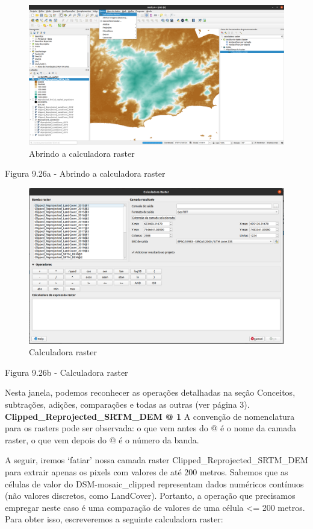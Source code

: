 \documentclass[
]{book}
\begin{document}
\begin{figure}
\centering
\includegraphics{media/modulo9/fig926_a.png}
\caption{Abrindo a calculadora raster}
\end{figure}

Figura 9.26a - Abrindo a calculadora raster

\begin{figure}
\centering
\includegraphics{media/modulo9/fig926_b.png}
\caption{Calculadora raster}
\end{figure}

Figura 9.26b - Calculadora raster

Nesta janela, podemos reconhecer as operações detalhadas na seção Conceitos, subtrações, adições, comparações e todas as outras (ver página 3). \textbf{Clipped\_Reprojected\_SRTM\_DEM @ 1} A convenção de nomenclatura para os rasters pode ser observada: o que vem antes do @ é o nome da camada raster, o que vem depois do @ é o número da banda.

A seguir, iremos `fatiar' nossa camada raster Clipped\_Reprojected\_SRTM\_DEM para extrair apenas os pixels com valores de até 200 metros. Sabemos que as células de valor do DSM-mosaic\_clipped representam dados numéricos contínuos (não valores discretos, como LandCover). Portanto, a operação que precisamos empregar neste caso é uma comparação de valores de uma célula \textless= 200 metros. Para obter isso, escreveremos a seguinte calculadora raster:
\end{document}

